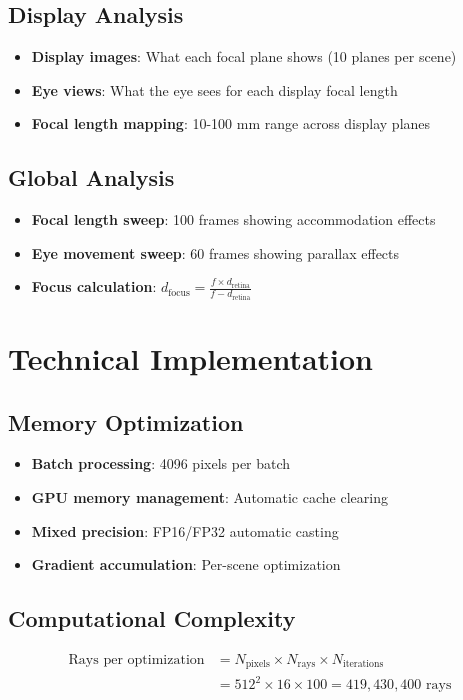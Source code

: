 \documentclass[11pt]{article}
\begin{document}
\subsection{Display Analysis}
\begin{itemize}
    \item \textbf{Display images}: What each focal plane shows (10 planes per scene)
    \item \textbf{Eye views}: What the eye sees for each display focal length
    \item \textbf{Focal length mapping}: 10-100 mm range across display planes
\end{itemize}

\subsection{Global Analysis}
\begin{itemize}
    \item \textbf{Focal length sweep}: 100 frames showing accommodation effects
    \item \textbf{Eye movement sweep}: 60 frames showing parallax effects
    \item \textbf{Focus calculation}: $d_{\text{focus}} = \frac{f \times d_{\text{retina}}}{f - d_{\text{retina}}}$
\end{itemize}

\section{Technical Implementation}

\subsection{Memory Optimization}
\begin{itemize}
    \item \textbf{Batch processing}: 4096 pixels per batch
    \item \textbf{GPU memory management}: Automatic cache clearing
    \item \textbf{Mixed precision}: FP16/FP32 automatic casting
    \item \textbf{Gradient accumulation}: Per-scene optimization
\end{itemize}

\subsection{Computational Complexity}
\begin{align}
\text{Rays per optimization} &= N_{\text{pixels}} \times N_{\text{rays}} \times N_{\text{iterations}} \\
&= 512^2 \times 16 \times 100 = 419,430,400 \text{ rays}
\end{align}
\end{document}
